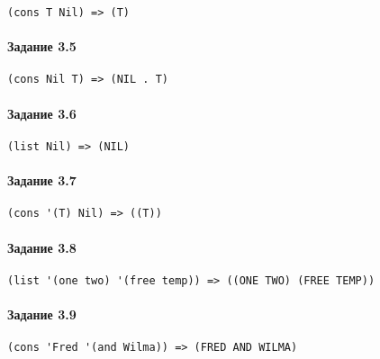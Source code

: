 \begin{lstlisting}
(cons T Nil) => (T)
\end{lstlisting}


\paragraph{Задание 3.5} \hfill

\begin{lstlisting}
(cons Nil T) => (NIL . T)
\end{lstlisting}


\paragraph{Задание 3.6} \hfill

\begin{lstlisting}
(list Nil) => (NIL)
\end{lstlisting}


\paragraph{Задание 3.7} \hfill

\begin{lstlisting}
(cons '(T) Nil) => ((T))
\end{lstlisting}


\paragraph{Задание 3.8} \hfill

\begin{lstlisting}
(list '(one two) '(free temp)) => ((ONE TWO) (FREE TEMP))
\end{lstlisting}


\paragraph{Задание 3.9} \hfill

\begin{lstlisting}
(cons 'Fred '(and Wilma)) => (FRED AND WILMA)
\end{lstlisting}